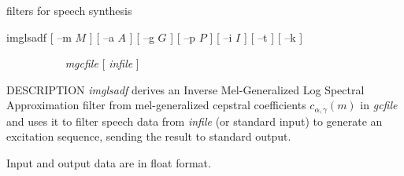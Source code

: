 % 
% 
% 
% 
%                                                                        
%
\hypertarget{imglsadf}{}
{filters for speech synthesis}

\begin{synopsis}
\item [imglsadf] [ --m $M$ ] [ --a $A$ ] [ --g $G$ ] [ --p $P$ ]
		 [ --i $I$ ]  [ --t ]  [ --k ]
\item [\ ~~~~~~~~~] {\em mgcfile} [ {\em infile} ]
\end{synopsis}

\begin{qsection}{DESCRIPTION}
{\em imglsadf} derives an Inverse Mel-Generalized 
Log Spectral Approximation filter from 
mel-generalized cepstral coefficients $c_{\alpha,\gamma}(m)$ in {\em gcfile} 
and uses it to filter speech data from {\em infile} (or standard input) 
to generate an excitation sequence,
sending the result to standard output.

Input and output data are in float format.
\end{qsection}

